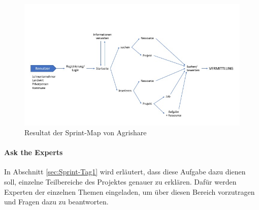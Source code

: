 \begin{figure}[h!]
	\includegraphics[width=\textwidth]{99_IMG/03_Umsetzung/map.jpg}
	\caption{Resultat der Sprint-Map von Agrishare}
	\label{fig:map}
\end{figure}
%

\paragraph{Ask the Experts}
In Abschnitt \ref{sec:Sprint-Tag1} wird erläutert, dass diese Aufgabe dazu dienen soll, einzelne Teilbereiche des Projektes genauer zu erklären. Dafür werden Experten der einzelnen Themen eingeladen, um über diesen Bereich vorzutragen und Fragen dazu zu beantworten. 


